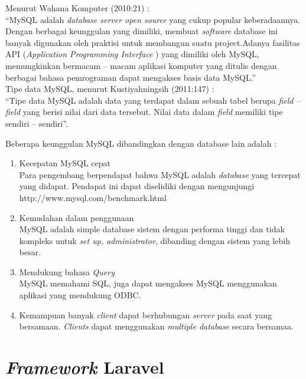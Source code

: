 Menurut Wahana Komputer (2010:21) : \\
“MySQL adalah \textit{database server open source} yang cukup popular keberadaannya. Dengan berbagai keunggulan yang dimiliki, membuat \textit{software} database ini banyak digunakan oleh praktisi untuk membangun suatu project.Adanya fasilitas API (\textit{Application Programming Interface} ) yang dimiliki oleh MySQL, memungkinkan bermacam – macam aplikasi komputer yang ditulis dengan berbagai bahasa pemrograman dapat mengakses basis data MySQL.” \\

Tipe data MySQL, menurut Kustiyahningsih (2011:147) : \\
“Tipe data MySQL adalah data yang terdapat dalam sebuah tabel berupa \textit{field – field} yang berisi nilai dari data tersebut. Nilai data dalam \textit{field} memiliki tipe sendiri – sendiri”.

Beberapa keunggulan MySQL dibandingkan dengan database lain adalah \cite{5} :

\begin{enumerate}

\item Kecepatan MySQL cepat \\
Para pengembang berpendapat bahwa MySQL adalah \textit{database} yang tercepat yang didapat. Pendapat ini dapat diselidiki dengan mengunjungi http://www.mysql.com/benchmark.html

\item Kemudahan dalam penggunaan \\
MySQL adalah simple database sistem dengan performa tinggi dan tidak kompleks untuk \textit{set up, administrator}, dibanding dengan sistem yang lebih besar.

\item Mendukung bahasa \textit{Query} \\
MySQL memahami SQL, juga dapat mengakses MySQL menggunakan aplikasi yang mendukung ODBC.

\item Kemampuan banyak \textit{client} dapat berhubungan \textit{server} pada saat yang bersamaan. \textit{Clients} dapat menggunakan \textit{multiple database} secara bersamaa. 

\end{enumerate} 

\section{\textit{Framework} Laravel}

